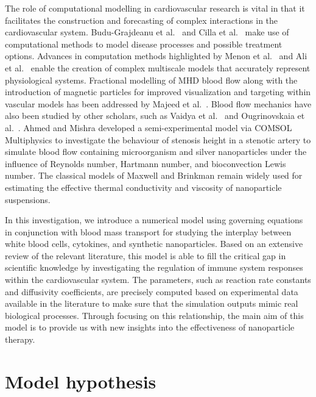 \documentclass[10pt]{NSP1}
\begin{document}
	The role of computational modelling in cardiovascular research is vital in that it facilitates the construction and forecasting of complex interactions in the cardiovascular system. Budu-Grajdeanu et al.\ \cite{Budu2008} and Cilla et al.\ \cite{Cilla2014} make use of computational methods to model disease processes and possible treatment options. Advances in computation methods highlighted by Menon et al.\ \cite{Menon2024} and Ali et al.\ \cite{Ali2021} enable the creation of complex multiscale models that accurately represent physiological systems. Fractional modelling of MHD blood flow along with the introduction of magnetic particles for improved visualization and targeting within vascular models has been addressed by Majeed et al.\ \cite{Majeed2022}. Blood flow mechanics have also been studied by other scholars, such as Vaidya et al.\ \cite{Vaidya2021} and Ougrinovskaia et al.\ \cite{Ougrinovskaia2010}. Ahmed and Mishra \cite{AhmedMishra2026} developed a semi-experimental model via COMSOL Multiphysics to investigate the behaviour of stenosis height in a stenotic artery to simulate blood flow containing microorganism and silver nanoparticles under the influence of Reynolds number, Hartmann number, and bioconvection Lewis number. The classical models of Maxwell \cite{Maxwell1873} and Brinkman \cite{Brinkman1952} remain widely used for estimating the effective thermal conductivity and viscosity of nanoparticle suspensions.
	
	In this investigation, we introduce a numerical model using governing equations in conjunction with blood mass transport for studying the interplay between white blood cells, cytokines, and synthetic nanoparticles. Based on an extensive review of the relevant literature, this model is able to fill the critical gap in scientific knowledge by investigating the regulation of immune system responses within the cardiovascular system. The parameters, such as reaction rate constants and diffusivity coefficients, are precisely computed based on experimental data available in the literature to make sure that the simulation outputs mimic real biological processes. Through focusing on this relationship, the main aim of this model is to provide us with new insights into the effectiveness of nanoparticle therapy.
	
	\section{Model hypothesis}
	
\end{document}
